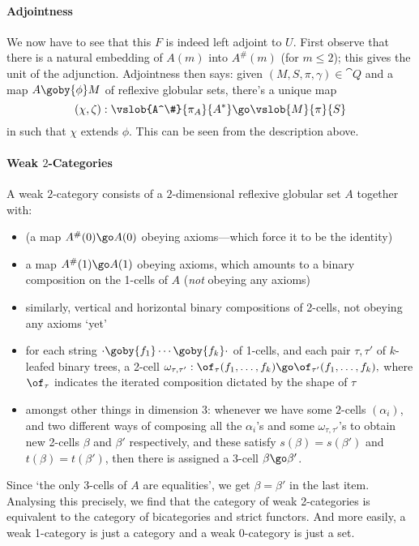 \paragraph{Adjointness}

We now have to see that this $F$ is indeed left adjoint to $U$.  First
observe that there is a natural embedding of $A(m)$ into $A^\#(m)$ (for
$m\leq 2$); this gives the unit of the adjunction.  Adjointness then says:
given $(M,S,\pi,\gamma) \in \cat{Q}$ and a map $A \goby{\phi} M$
of reflexive globular sets, there's a unique map
\[
(\chi,\zeta): \vslob{A^\#}{\pi_A}{A^*} \go \vslob{M}{\pi}{S}
\]
in  such that $\chi$ extends $\phi$.  This can be seen from the
description above.

\paragraph{Weak $2$-Categories}

A weak $2$-category consists of a $2$-dimensional reflexive globular set $A$
together with:
%
\begin{itemize}
\item (a map $A^\#(0) \go A(0)$ obeying axioms---which force it to be the
identity)
\item a map $A^\#(1) \go A(1)$ obeying axioms, which amounts to a binary
composition on the 1-cells of $A$ (\emph{not} obeying any axioms)
\item similarly, vertical and horizontal binary compositions of 2-cells, not
obeying any axioms `yet'
\item for each string $\cdot \goby{f_1} \cdots \goby{f_k} \cdot$ of 1-cells,
and each pair $\tau,\tau'$ of $k$-leafed binary trees, a 2-cell
$
\omega_{\tau,\tau'}: 
\of_{\tau}(f_1, \ldots, f_k) \go \of_{\tau'}(f_1, \ldots, f_k), 
$
where $\of_{\tau}$ indicates the iterated composition dictated by the shape
of $\tau$
\item amongst other things in dimension $3$: whenever we have some $2$-cells
$(\alpha_i)$, and two different ways of composing all the $\alpha_i$'s and
some $\omega_{\tau,\tau'}$'s to obtain new 2-cells $\beta$ and $\beta'$
respectively, and these satisfy $s(\beta)=s(\beta')$ and
$t(\beta)=t(\beta')$, then there is assigned a 3-cell $\beta\go\beta'$.
\end{itemize}
%
Since `the only $3$-cells of $A$ are equalities', we get $\beta=\beta'$ in
the last item.  Analysing this precisely, we find that the category of weak
2-categories is equivalent to the category of bicategories and strict
functors.  And more easily, a weak 1-category is just a category and a weak
0-category is just a set.



